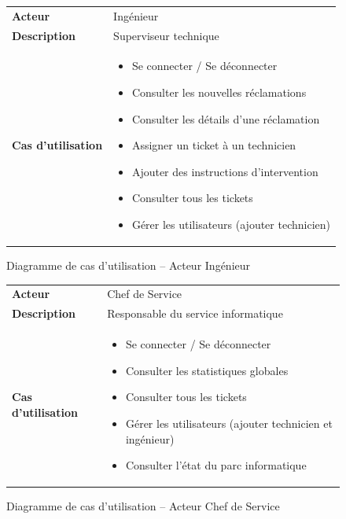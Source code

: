 \documentclass[12pt,a4paper,twoside]{report}
\begin{document}
\begin{figure}[H]
    \centering
    \caption{Diagramme de cas d'utilisation -- Acteur Ingénieur}
    \label{fig:uc-ingenieur}
    \begin{tabular}{p{5cm} p{8cm}}
        \toprule
        \textbf{Acteur} & Ingénieur \\
        \textbf{Description} & Superviseur technique \\
        \textbf{Cas d'utilisation} &
        \begin{itemize}
            \item Se connecter / Se déconnecter
            \item Consulter les nouvelles réclamations
            \item Consulter les détails d'une réclamation
            \item Assigner un ticket à un technicien
            \item Ajouter des instructions d'intervention
            \item Consulter tous les tickets
            \item Gérer les utilisateurs (ajouter technicien)
        \end{itemize} \\
        \bottomrule
    \end{tabular}
\end{figure}

\begin{figure}[H]
    \centering
    \caption{Diagramme de cas d'utilisation -- Acteur Chef de Service}
    \label{fig:uc-chef}
    \begin{tabular}{p{5cm} p{8cm}}
        \toprule
        \textbf{Acteur} & Chef de Service \\
        \textbf{Description} & Responsable du service informatique \\
        \textbf{Cas d'utilisation} &
        \begin{itemize}
            \item Se connecter / Se déconnecter
            \item Consulter les statistiques globales
            \item Consulter tous les tickets
            \item Gérer les utilisateurs (ajouter technicien et ingénieur)
            \item Consulter l'état du parc informatique
        \end{itemize} \\
        \bottomrule
    \end{tabular}
\end{figure}
\end{document}
